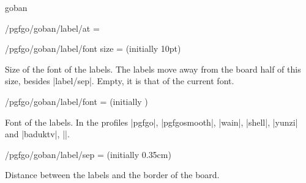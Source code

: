 \begin{environment}{{goban}}
\begin{key}{/pgfgo/goban/label/at =}
		\begin{codeexample}[]
			\begin{goban}[12, label = {at = {all}}]
			\end{goban}

			\begin{goban}[partial = A6:I9, label = {at = north}]
			\end{goban}

			\begin{goban}[partial = B2:E4, label = {at = {north, east}}]
			\end{goban}
		\end{codeexample}
	\end{key}

	\begin{key}{/pgfgo/goban/label/font size =  (initially 10pt)}

		Size of the font of the labels. The labels move away from the board half of this size, besides |label/sep|. Empty, it is that of the current font.

		\begin{codeexample}[]
			\begin{goban}[5, label = {at = {south, west}}]
			\end{goban}

			\begin{goban}[5, label = {at = {south, west}, font size = 6pt}]
			\end{goban}
		\end{codeexample}
	\end{key}

	\begin{key}{/pgfgo/goban/label/font =  (initially \texttt{\string\normalfont})}

		Font of the labels. In the profiles |pgfgo|, |pgfgosmooth|, |wain|, |shell|, |yunzi| and |baduktv|, |\sffamily|.

		\begin{codeexample}[]
			\begin{goban}[5, label = {at = {south, west}, font = \bfseries}]
			\end{goban}
		\end{codeexample}
	\end{key}

	\begin{key}{/pgfgo/goban/label/sep =  (initially 0.35cm)}

		Distance between the labels and the border of the board.
	\end{key}


\end{environment}
